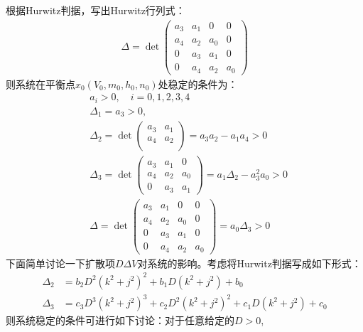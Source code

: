 \documentclass[
pdflinks,
]{xjtuthesis}
\begin{document}
根据Hurwitz判据，写出Hurwitz行列式：
\begin{align}
\Delta = \det
\left(
\begin{array}{cccc}
a_3 & a_1 & 0 & 0\\
a_4 & a_2 & a_0 & 0\\
0 & a_3 & a_1 & 0\\
0 & a_4 & a_2 & a_0 
\end{array}
\right)
\end{align}
则系统在平衡点$x_0(V_{0},m_{0},h_{0},n_{0})$处稳定的条件为：
\begin{align*}
&a_i>0, \quad i=0,1,2,3,4 \\
& \Delta_1= a_3>0,\\
& \Delta_2 = \det
\left(
\begin{array}{cc}
a_3 & a_1 \\
a_4 & a_2 \\
\end{array}
\right) =a_3a_2-a_1a_4>0 \\
& \Delta_3 = \det
\left(
\begin{array}{cccc}a_3 & a_1 & 0 \\
a_4 & a_2 & a_0 \\
0 & a_3 & a_1 
\end{array}
\right)=a_1 \Delta_2-a_3^2a_0>0\\
&\Delta = \det
\left(
\begin{array}{cccc}
a_3 & a_1 & 0 & 0\\
a_4 & a_2 & a_0 & 0\\
0 & a_3 & a_1 & 0\\
0 & a_4 & a_2 & a_0 
\end{array}
\right) =a_0\Delta_3>0
\end{align*}
下面简单讨论一下扩散项$D\Delta V$对系统的影响。考虑将Hurwitz判据写成如下形式：
\begin{align}
\Delta_2 &=b_2D^2(k^2+j^2)^2+b_1D(k^2+j^2)+b_0\\
\Delta_3 &=c_3D^3(k^2+j^2)^3+c_2D^2(k^2+j^2)^2+c_1D(k^2+j^2)+c_0
\end{align}
则系统稳定的条件可进行如下讨论：对于任意给定的$D>0$,
\end{document}
